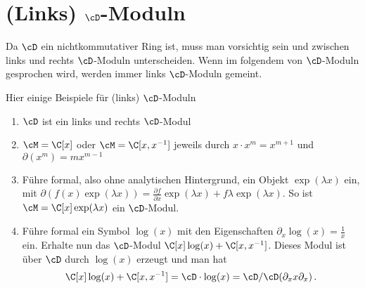 \section{(Links) $\cD$-Moduln}
Da $\cD$ ein nichtkommutativer Ring ist, muss man vorsichtig sein und zwischen
links und rechts $\cD$-Moduln unterscheiden.
Wenn im folgendem von $\cD$-Moduln gesprochen wird, werden immer
links $\cD$-Moduln gemeint.

\begin{exmp}
Hier einige Beispiele für (links) $\cD$-Moduln
\begin{comment}
\cite[Exmp 2.2]{ArkhipovDmod}
\end{comment}
\begin{enumerate}
%
\item $\cD$ ist ein links und rechts $\cD$-Modul
%
\item $\cM=\C[x]$ oder $\cM=\C[x,x^{-1}]$ jeweils durch $x\cdot x^{m}=x^{m+1}$
und $\partial(x^m)=mx^{m-1}$
%
\item
Führe formal, also ohne analytischen Hintergrund, ein Objekt
$\exp(\lambda x)$ ein, mit $\partial(f(x)\exp(\lambda x))=\frac{\partial
f}{\partial x}\exp(\lambda x)+f\lambda\exp(\lambda x)$.  So ist
$\cM=\C[x]\exp(\lambda x)$ ein $\cD$-Modul.
%
\begin{comment}
\cite[Exmp 2.2]{ArkhipovDmod}
\end{comment}
\item 
Führe formal ein Symbol $\log(x)$ mit den Eigenschaften
$\partial_x\log(x)=\frac{1}{x}$ ein. Erhalte nun das $\cD$-Modul
$\C[x]\log(x)+\C[x,x^{-1}]$. Dieses Modul ist über $\cD$ durch $\log(x)$
erzeugt und man hat
\[
\C[x]\log(x)+\C[x,x^{-1}]=\cD\cdot\log(x)=\cD\slash\cD(\partial_x x\partial_x) \,.
\]
%
\begin{comment}
\cite[Exmp 3.1.4]{ginzburg}
\end{comment}
\end{enumerate}
\end{exmp}

\begin{comment}
\begin{lem}\cite[Lem 2.3.3.]{sabbah_cimpa90}
Sei $\cM$ ein links $\cD$-Modul von endlichem Typ, welches auch von endlichem
Typ über $\Ckx$ ist. Dann ist $\cM$ bereits ein freies $\C\{x\}$-Modul.
\end{lem}
\begin{proof}
Siehe \cite[Lem 2.3.3.]{sabbah_cimpa90}.
\end{proof}
\begin{cor} \cite[Cor 2.3.4.]{sabbah_cimpa90}
Falls $\cM$ ein links $\cD$-Modul von endlichem Typ, welches außerdem ein
endlich dimensionaler Vektorraum ist, so ist schon $\cM=\{0\}$.
\end{cor}
\end{comment}

